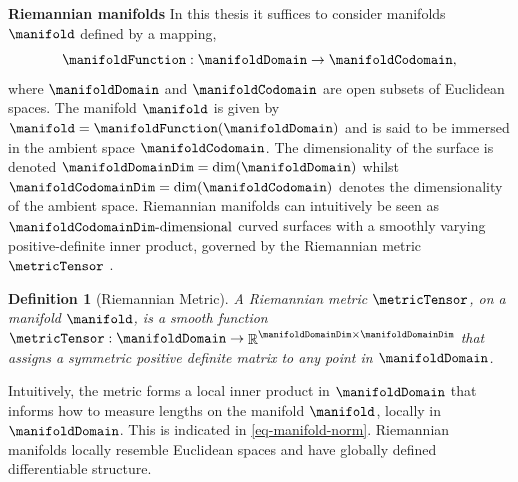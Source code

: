 \documentclass{mimosis-class/mimosis}
\newtheorem{definition}{Definition}[section]
\numberwithin{equation}{chapter}
\DeclareMathOperator{\R}{\mathbb{R}}
\begin{document}
{\newline
\begin{myquote}
\textbf{Riemannian manifolds}
In this thesis it suffices to consider manifolds $\manifold$ defined by a mapping,
\begin{equation} \label{eq-manifold-function}
\manifoldFunction : \manifoldDomain \rightarrow \manifoldCodomain,
\end{equation}
where $\manifoldDomain$ and $\manifoldCodomain$ are open subsets of Euclidean spaces.
The manifold $\manifold$ is given by $\manifold = \manifoldFunction(\manifoldDomain)$ and is said to
be immersed in the ambient space $\manifoldCodomain$.
The dimensionality of the surface is denoted $\manifoldDomainDim = \text{dim}(\manifoldDomain)$
whilst $\manifoldCodomainDim = \text{dim}(\manifoldCodomain)$ denotes the dimensionality of the ambient space.
Riemannian manifolds can intuitively be seen as $\manifoldCodomainDim\text{-dimensional}$
curved surfaces with a smoothly
varying positive-definite inner product, governed by the Riemannian metric $\metricTensor$ \citep{carmoRiemannian1992}.
\begin{definition}[Riemannian Metric]
A Riemannian metric $\metricTensor$,
on a manifold $\manifold$, is a smooth function
$\metricTensor : \manifoldDomain \rightarrow \R^{\manifoldDomainDim \times \manifoldDomainDim}$
that assigns a symmetric positive definite matrix to any point in $\manifoldDomain$.
\end{definition}
Intuitively, the metric forms a local inner product in $\manifoldDomain$ that informs how to measure lengths
on the manifold $\manifold$, locally in $\manifoldDomain$.
This is indicated in \cref{eq-manifold-norm}.
Riemannian manifolds locally resemble Euclidean spaces and have
globally defined differentiable structure.
\end{myquote}
\newline

}
\end{document}

